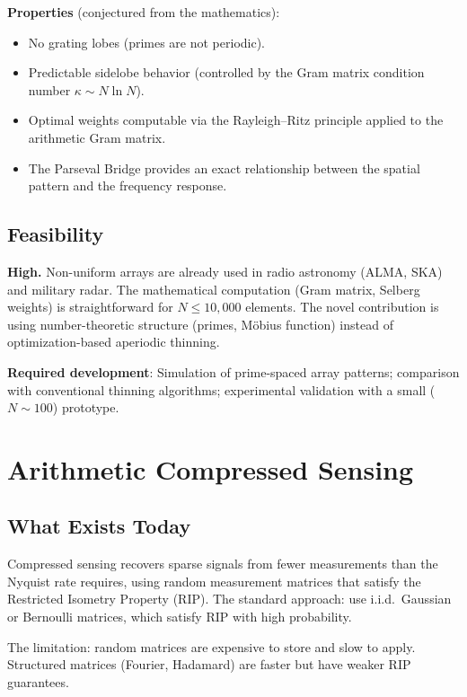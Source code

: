 \documentclass[11pt,a4paper]{article}
\begin{document}
\textbf{Properties} (conjectured from the mathematics):
\begin{itemize}
  \item No grating lobes (primes are not periodic).
  \item Predictable sidelobe behavior (controlled by the Gram
    matrix condition number $\kappa \sim N \ln N$).
  \item Optimal weights computable via the Rayleigh--Ritz principle
    applied to the arithmetic Gram matrix.
  \item The Parseval Bridge provides an exact relationship between
    the spatial pattern and the frequency response.
\end{itemize}

\subsection{Feasibility}

\textbf{High.} Non-uniform arrays are already used in radio
astronomy (ALMA, SKA) and military radar. The mathematical
computation (Gram matrix, Selberg weights) is straightforward for
$N \leq 10{,}000$ elements. The novel contribution is using
number-theoretic structure (primes, M\"obius function) instead of
optimization-based aperiodic thinning.

\textbf{Required development}: Simulation of prime-spaced array
patterns; comparison with conventional thinning algorithms;
experimental validation with a small ($N \sim 100$) prototype.

\section{Arithmetic Compressed Sensing}
\label{sec:cs}

\subsection{What Exists Today}

Compressed sensing recovers sparse signals from fewer measurements
than the Nyquist rate requires, using random measurement matrices
that satisfy the Restricted Isometry Property (RIP). The standard
approach: use i.i.d.\ Gaussian or Bernoulli matrices, which satisfy
RIP with high probability.

The limitation: random matrices are expensive to store and slow to
apply. Structured matrices (Fourier, Hadamard) are faster but have
weaker RIP guarantees.
\end{document}
